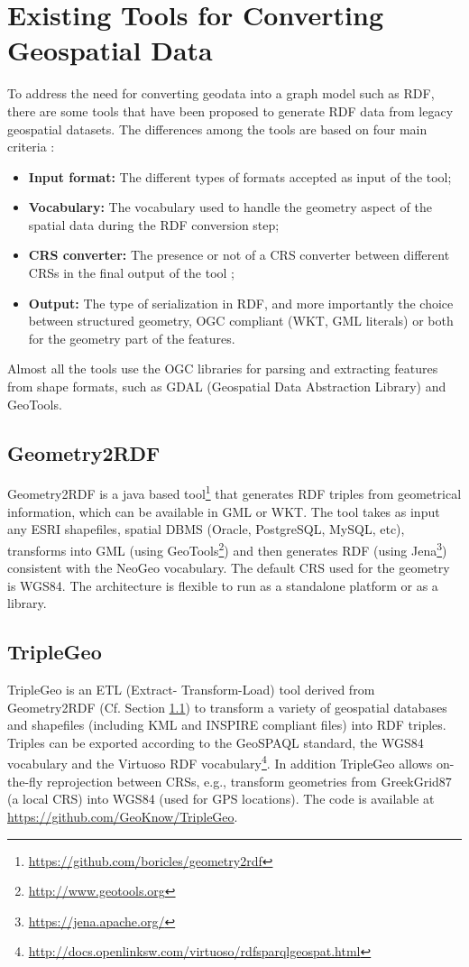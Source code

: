 \section{Existing Tools for Converting Geospatial Data}
\label{sec:toolgeo}
To address the need for converting geodata into a graph model such as RDF, there are some tools that have been proposed to generate RDF data from legacy geospatial datasets. The differences among the tools are based on four main criteria :
\begin{itemize}
\item \textbf{Input format:} The different types of formats accepted as input of the tool;
\item \textbf{Vocabulary:} The vocabulary used to handle the geometry aspect of the spatial data during the RDF conversion step;
\item \textbf{CRS converter:} The presence or not of a CRS converter between different CRSs in the final output of the tool ;
\item \textbf{Output:} The type of serialization in RDF, and more importantly the choice between structured geometry, OGC compliant (WKT, GML literals) or both for the geometry part of the features.
\end{itemize}

Almost all the tools use the OGC libraries for parsing and extracting features from shape formats, such as GDAL (Geospatial Data Abstraction Library) and GeoTools.

\subsection{Geometry2RDF} \label{sec:geo2rdf}
Geometry2RDF \cite{deLeon2010} is a java based tool\footnote{\url{https://github.com/boricles/geometry2rdf}} that generates RDF triples from geometrical information, which can be available in GML or WKT. The tool takes as input any ESRI shapefiles, spatial DBMS (Oracle,  PostgreSQL, MySQL, etc), transforms into GML (using GeoTools\footnote{\url{http://www.geotools.org}}) and then generates RDF (using Jena\footnote{\url{https://jena.apache.org/}}) consistent with the NeoGeo vocabulary. The default CRS used for the geometry is WGS84. The architecture is flexible to run as a standalone platform or as a library.

\subsection{TripleGeo}
TripleGeo \cite{triplegeo2014} is an ETL (Extract- Transform-Load) tool derived from Geometry2RDF (Cf. Section \ref{sec:geo2rdf}) to transform a variety of geospatial databases and shapefiles (including KML and INSPIRE compliant files) into RDF triples. Triples can be exported according to the GeoSPAQL standard, the WGS84 vocabulary and the Virtuoso RDF vocabulary\footnote{\url{http://docs.openlinksw.com/virtuoso/rdfsparqlgeospat.html}}. In addition TripleGeo allows on-the-fly reprojection between CRSs, e.g., transform geometries from GreekGrid87 (a local CRS) into WGS84 (used for GPS locations). The code is available at \url{https://github.com/GeoKnow/TripleGeo}.

